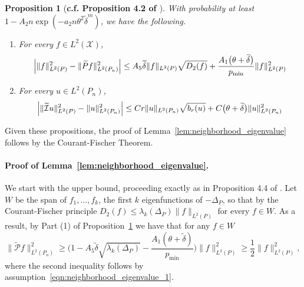 \documentclass[twoside]{article}
\newcommand{\1}{\mathbf{1}}
\newcommand{\Xset}{\mathcal{X}}
\newcommand{\Leb}{L}
\newcommand{\mc}[1]{\mathcal{#1}}
\newcommand{\wt}[1]{\widetilde{#1}}
\newtheorem{proposition}{Proposition}
\theoremstyle{definition}
\theoremstyle{remark}
\begin{document}
\begin{proposition}[\textbf{c.f. Proposition 4.2 of \citet{calder2019}}]
	\label{prop:isometry}
	With probability at least $1 - A_2n\exp(-a_2n\theta^2\wt{\delta}^{m})$, we have the following.
	\begin{enumerate}[(1)]
		\item For every $f \in \Leb^2(\Xset)$,
		\begin{equation*}
		\Bigl|\|f\|_{\Leb^2(P)}^2 - \|\wt{P}f\|_{\Leb^2(P_n)}^2\Bigr| \leq A_5 \wt{\delta} \|f\|_{\Leb^2(P)} \sqrt{D_2(f)} + \frac{A_1\bigl(\theta + \wt{\delta}\bigr)}{p_{\min}} \|f\|_{\Leb^2(P)}^2
		\end{equation*}
		\item For every $u \in \Leb^2(P_n)$,
		\begin{equation*}
		\Bigl|\|\wt{\mc{I}}u\|_{\Leb^2(P)}^2 - \|u\|_{\Leb^2(P_n)}^2\Bigr| \leq C r \|u\|_{\Leb^2(P_n)} \sqrt{b_r(u)} + C\bigl(\theta + \wt{\delta}\bigr) \|u\|_{\Leb^2(P_n)}^2
		\end{equation*}
	\end{enumerate}
\end{proposition}

Given these propositions, the proof of Lemma~\ref{lem:neighborhood_eigenvalue} follows by the Courant-Fischer Theorem.

\paragraph{Proof of Lemma~\ref{lem:neighborhood_eigenvalue}.}
We start with the upper bound, proceeding exactly as in Proposition 4.4 of \citep{burago2014}. Let $W$ be the span of $f_1,\ldots,f_{k}$, the first $k$ eigenfunctions of $-\Delta_P$, so that by the Courant-Fischer principle $D_2(f) \leq \lambda_k(\Delta_P) \|f\|_{\Leb^2(P)}$ for every $f \in W$. As a result, by Part (1) of Proposition~\ref{prop:isometry} we have that for any $f \in W$
\begin{equation*}
\bigl\|\wt{\mc{P}}f\bigr\|_{\Leb^2(P_n)}^2 \geq \biggl(1 - A_5\wt{\delta} \sqrt{\lambda_{k}(\Delta_P)} - \frac{A_1(\theta + \wt{\delta})}{p_{\min}}\biggr)\|f\|_{\Leb^2(P)}^2  \geq \frac{1}{2} \|f\|_{\Leb^2(P)}^2,
\end{equation*}
where the second inequality follows by assumption~\eqref{eqn:neighborhood_eigenvalue_1}.
\end{document}
